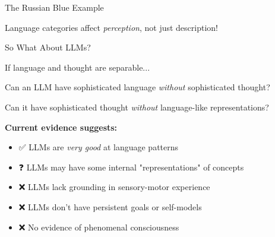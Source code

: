 \documentclass[aspectratio=169]{beamer}
\begin{document}
\begin{frame}[shrink=5]{The Russian Blue Example 🎨}
\begin{center}
\end{center}

\vspace{-0.2cm}

\begin{thinkaboutit}
Language categories affect \textit{perception}, not just description!
\end{thinkaboutit}
\end{frame}

\begin{frame}[shrink=10]{So What About LLMs? 🤖}
\begin{thinkaboutit}
If language and thought are separable...

Can an LLM have sophisticated language \textit{without} sophisticated thought?

Can it have sophisticated thought \textit{without} language-like representations?
\end{thinkaboutit}

\vspace{0.3cm}

\small
\textbf{Current evidence suggests:}
\begin{itemize}\setlength{\itemsep}{0pt}\setlength{\itemsep}{0pt}
    \item ✅ LLMs are \textit{very good} at language patterns
    \item ❓ LLMs may have some internal "representations" of concepts
    \item ❌ LLMs lack grounding in sensory-motor experience
    \item ❌ LLMs don't have persistent goals or self-models
    \item ❌ No evidence of phenomenal consciousness
\end{itemize}
\end{frame}
\end{document}
